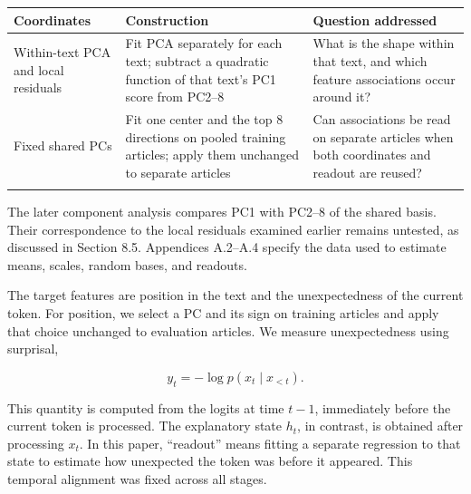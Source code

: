 \begingroup
\fontsize{9.3}{12}\selectfont\setlength{\tabcolsep}{3.3pt}
{
\begin{longtable}[]{@{}
  >{\raggedright\arraybackslash}p{}
  >{\raggedright\arraybackslash}p{}
  >{\raggedright\arraybackslash}p{}@{}}
\toprule\noalign{}
\begin{minipage}[b]{\linewidth}\raggedright
Coordinates
\end{minipage} & \begin{minipage}[b]{\linewidth}\raggedright
Construction
\end{minipage} & \begin{minipage}[b]{\linewidth}\raggedright
Question addressed
\end{minipage} \\
\midrule\noalign{}
\endhead
\bottomrule\noalign{}
\endlastfoot
Within-text PCA and local residuals & Fit PCA separately for each text; subtract a quadratic function of that text's PC1 score from PC2--8 & What is the shape within that text, and which feature associations occur around it? \\*
Fixed shared PCs & Fit one center and the top 8 directions on pooled training articles; apply them unchanged to separate articles & Can associations be read on separate articles when both coordinates and readout are reused? \\*
\end{longtable}
}
\endgroup

The later component analysis compares PC1 with PC2--8 of the shared basis. Their correspondence to the local residuals examined earlier remains untested, as discussed in Section 8.5. Appendices A.2--A.4 specify the data used to estimate means, scales, random bases, and readouts.

The target features are position in the text and the unexpectedness of the current token. For position, we select a PC and its sign on training articles and apply that choice unchanged to evaluation articles. We measure unexpectedness using surprisal,

\[
y_t=-\log p(x_t\mid x_{<t}).
\]

This quantity is computed from the logits at time \(t-1\), immediately before the current token is processed. The explanatory state \(h_t\), in contrast, is obtained after processing \(x_t\). In this paper, ``readout'' means fitting a separate regression to that state to estimate how unexpected the token was before it appeared. This temporal alignment was fixed across all stages.

